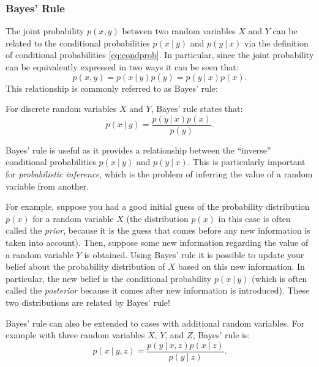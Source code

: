 \subsubsection{Bayes' Rule}
The joint probability $p(x,y)$ between two random variables $X$ and $Y$ can be related to the conditional probabilities $p(x \:|\: y)$ and $p(y \:|\: x)$ via the definition of conditional probabilities \eqref{eq:condprob}. In particular, since the joint probability can be equivalently expressed in two ways it can be seen that:
\begin{equation*}
    p(x,y) = p(x \:|\: y)p(y) = p(y \:|\: x) p(x).
\end{equation*}
This relationship is commonly referred to as Bayes' rule:
\begin{definition}
For discrete random variables $X$ and $Y$, Bayes' rule states that:
\begin{equation} \label{eq:bayes}
    p(x \:|\: y) = \frac{p(y \:|\: x) p(x)}{p(y)}. 
\end{equation}
\end{definition}
Bayes' rule is useful as it provides a relationship between the ``inverse'' conditional probabilities $p(x \:|\: y)$ and $p(y \:|\: x)$. This is particularly important for \textit{probabilistic inference}, which is the problem of inferring the value of a random variable from another. 

For example, suppose you had a good initial guess of the probability distribution $p(x)$ for a random variable $X$ (the distribution $p(x)$ in this case is often called the \textit{prior}, because it is the guess that comes before any new information is taken into account). Then, suppose some new information regarding the value of a random variable $Y$ is obtained. Using Bayes' rule it is possible to update your belief about the probability distribution of $X$ based on this new information. In particular, the new belief is the conditional probability $p(x \:|\: y)$ (which is often called the \textit{posterior} because it comes after new information is introduced). These two distributions are related by Bayes' rule!

Bayes' rule can also be extended to cases with additional random variables. For example with three random variables $X$, $Y$, and $Z$, Bayes' rule is:
\begin{equation*}
    p(x \:|\: y, z) = \frac{p(y \:|\: x, z) p(x \:|\: z)}{p(y \:|\: z)}. 
\end{equation*}

